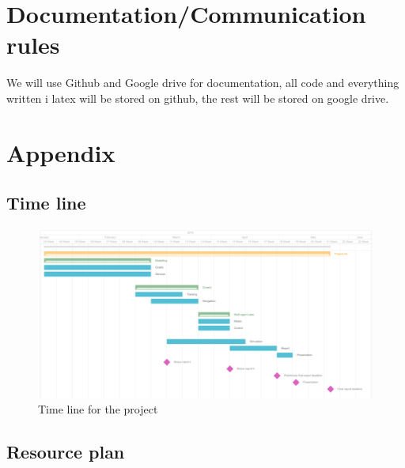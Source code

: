 \documentclass{article}
\begin{document}
	\section{Documentation/Communication rules}
	We will use Github and Google drive for documentation, all code and everything written i latex will be stored on github, the rest will be stored on google drive.
	\section{Appendix}
	
	\subsection{Time line}
		\begin{figure}[H]
			\centering
			\includegraphics[width=\linewidth]{img/timeline}
			\caption{Time line for the project}
		\end{figure}
	\subsection{Resource plan}
\end{document}
